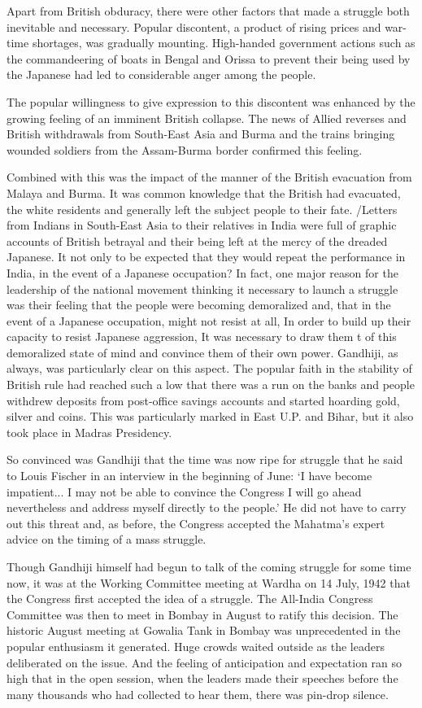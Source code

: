 Apart from British obduracy, there were other factors that made a struggle both inevitable and necessary. Popular discontent, a product of rising prices and war-time shortages, was gradually mounting. High-handed government actions such as the commandeering of boats in Bengal and Orissa to prevent their being used by the Japanese had led to considerable anger among the people.

The popular willingness to give expression to this discontent was enhanced by the growing feeling of an imminent British collapse. The news of Allied reverses and British withdrawals from South-East Asia and Burma and the trains bringing wounded soldiers from the Assam-Burma border confirmed this feeling.

Combined with this was the impact of the manner of the British evacuation from Malaya and Burma. It was common knowledge that the British had evacuated, the white residents and generally left the subject people to their fate. /Letters from Indians in South-East Asia to their relatives in India were full of graphic accounts of British betrayal and their being left at the mercy of the dreaded Japanese. It not only to be expected that they would repeat the performance in India, in the event of a Japanese occupation? In fact, one major reason for the leadership of the national movement thinking it necessary to launch a struggle was their feeling that the people were becoming demoralized and, that in the event of a Japanese occupation, might not resist at all, In order to build up their capacity to resist Japanese aggression, It was necessary to draw them t of this demoralized state of mind and convince them of their own power. Gandhiji, as always, was particularly clear on this aspect. The popular faith in the stability of British rule had reached such a low that there was a run on the banks and people withdrew deposits from post-office savings accounts and started hoarding gold, silver and coins. This was particularly marked in East U.P. and Bihar, but it also took place in Madras Presidency.

So convinced was Gandhiji that the time was now ripe for struggle that he said to Louis Fischer in an interview in the beginning of June: `I have become impatient... I may not be able to convince the Congress I will go ahead nevertheless and address myself directly to the people.' He did not have to carry out this threat and, as before, the Congress accepted the Mahatma's expert advice on the timing of a mass struggle.

Though Gandhiji himself had begun to talk of the coming struggle for some time now, it was at the Working Committee meeting at Wardha on 14 July, 1942 that the Congress first accepted the idea of a struggle. The All-India Congress Committee was then to meet in Bombay in August to ratify this decision. The historic August meeting at Gowalia Tank in Bombay was unprecedented in the popular enthusiasm it generated. Huge crowds waited outside as the leaders deliberated on the issue. And the feeling of anticipation and expectation ran so high that in the open session, when the leaders made their speeches before the many thousands who had collected to hear them, there was pin-drop silence.

